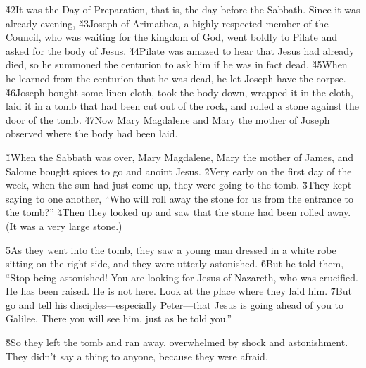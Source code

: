 \v{42}It was the Day of Preparation, that is, the day before the Sabbath. Since it was already evening, \v{43}Joseph of Arimathea, a highly respected member of the Council, who was waiting for the kingdom of God, went boldly to Pilate and asked for the body of Jesus. \v{44}Pilate was amazed to hear that Jesus had already died, so he summoned the centurion to ask him if he was in fact dead. \v{45}When he learned from the centurion that he was dead, he let Joseph have the corpse. \v{46}Joseph bought some linen cloth, took the body down, wrapped it in the cloth, laid it in a tomb that had been cut out of the rock, and rolled a stone against the door of the tomb. \v{47}Now Mary Magdalene and Mary the mother of Joseph observed where the body had been laid.

\v{1}When the Sabbath was over, Mary Magdalene, Mary the mother of James, and Salome bought spices to go and anoint Jesus. \v{2}Very early on the first day of the week, when the sun had just come up, they were going to the tomb. \v{3}They kept saying to one another, ``Who will roll away the stone for us from the entrance to the tomb?'' \v{4}Then they looked up and saw that the stone had been rolled away. (It was a very large stone.)

\v{5}As they went into the tomb, they saw a young man dressed in a white robe sitting on the right side, and they were utterly astonished. \v{6}But he told them, ``Stop being astonished! You are looking for Jesus of Nazareth, who was crucified. He has been raised. He is not here. Look at the place where they laid him. \v{7}But go and tell his disciples---especially Peter---that Jesus is going ahead of you to Galilee. There you will see him, just as he told you.''

\v{8}So they left the tomb and ran away, overwhelmed by shock and astonishment. They didn't say a thing to anyone, because they were afraid.

